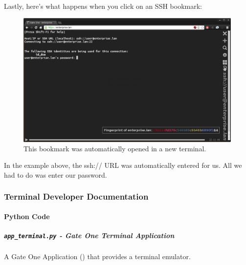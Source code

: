\documentclass[letterpaper,10pt,openany]{sphinxmanual}
\begin{document}
Lastly, here's what happens when you click on an SSH bookmark:
\begin{figure}[htbp]
\centering
\capstart

\includegraphics{gateone_opened_via_bookmark.png}
\caption{This bookmark was automatically opened in a new terminal.}\end{figure}

In the example above, the ssh:// URL was automatically entered for us.  All we had to do was enter our password.


\subsubsection{Terminal Developer Documentation}
\label{Applications/terminal/developer:terminal-developer-documentation}\label{Applications/terminal/developer::doc}

\paragraph{Python Code}
\label{Applications/terminal/developer:python-code}

\subparagraph{\texttt{app\_terminal.py} - Gate One Terminal Application}
\label{Applications/terminal/app_terminal:module-app_terminal}\label{Applications/terminal/app_terminal::doc}\label{Applications/terminal/app_terminal:app-terminal-py-gate-one-terminal-application}
A Gate One Application () that provides a terminal emulator.
\end{document}
